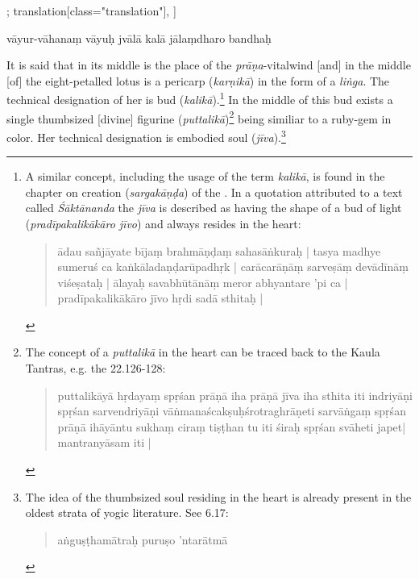 \begin{alignment}[
   texts=edition[class="edition"];
    translation[class="translation"],
  ]
\begin{edition}
\begin{prose}
{vāyur-vāhanaṃ\dd{}
         vāyuḥ\dd{}
        jvālā kalā\dd{}
        jālaṃdharo bandhaḥ\dd{}
        \dd{}
        \dd{}}
\end{prose}
\end{edition}
\begin{translation}
    \begin{tlate}
      \noindent
   It is said that in its middle is the place of the \textit{prāṇa}-vitalwind [and] in the middle [of] the eight-petalled lotus is a pericarp (\textit{karṇikā}) in the form of a \textit{liṅga}. The technical designation of her is bud (\textit{kalikā}).\textsuperscript{\coro{[\lowroman{20}]}}\footnote{A similar concept, including the usage of the term \textit{kalikā}, is found in the chapter on creation (\textit{sargakāṇḍa}) of the . In a quotation attributed to a text called \textit{Śāktānanda} the \textit{jīva} is described as having the shape of a bud of light (\textit{pradīpakalikākāro jīvo}) and always resides in the heart:
        \begin{quote} ādau sañjāyate bījaṃ brahmāṇḍaṃ sahasāṅkuraḥ | tasya madhye sumeruś ca kaṅkāladaṇḍarūpadhṛk | carācarāṇāṃ sarveṣāṃ devādīnāṃ viśeṣataḥ | ālayaḥ savabhūtānāṃ meror abhyantare 'pi ca | pradīpakalikākāro jīvo hṛdi sadā sthitaḥ |
        \end{quote}} In the middle of this bud exists a single thumbsized [divine] figurine (\textit{puttalikā})\footnote{The concept of a \textit{puttalikā} in the heart can be traced back to the Kaula Tantras, e.g. the  22.126-128: \begin{quote}  puttalikāyā hṛdayaṃ spṛśan prāṇā iha prāṇā jīva iha sthita iti indriyāṇi spṛśan sarvendriyāṇi vāṅmanaścakṣuḥśrotraghrāṇeti sarvāṅgaṃ spṛśan prāṇā ihāyāntu sukhaṃ ciraṃ tiṣṭhan tu iti śiraḥ spṛśan svāheti japet| mantranyāsam iti | \end{quote}} being similiar to a ruby-gem in color. Her technical designation is embodied soul (\textit{jīva}).\footnote{The idea of the thumbsized soul residing in the heart is already present in the oldest strata of yogic literature. See  6.17:
\begin{quote}
aṅguṣṭhamātraḥ puruṣo 'ntarātmā\\

\end{quote}}
\end{tlate}
\end{translation}
\end{alignment}
